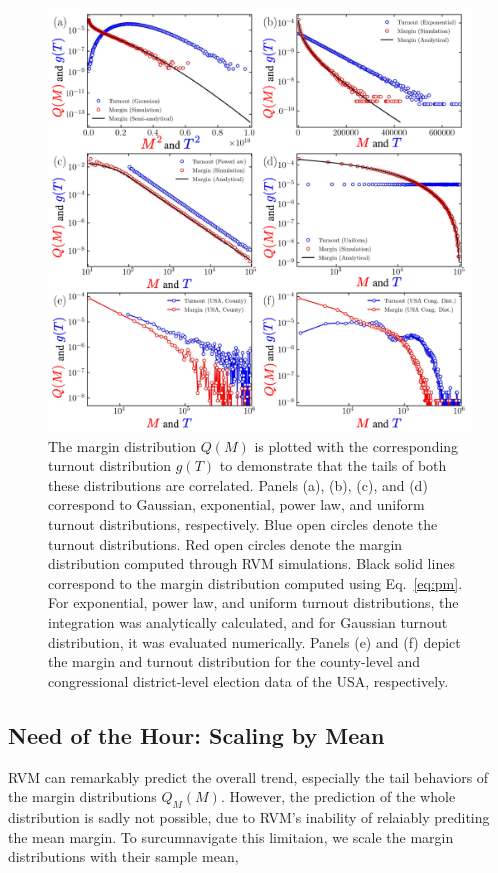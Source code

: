 \begin{figure}[H]
    \centering
    \includegraphics[width=\textwidth]{chapters/chapter5/margin_turnout_dists.pdf}
    \caption{The margin distribution $Q(M)$ is plotted with the corresponding turnout distribution $g(T)$ to demonstrate that the tails of both these distributions are correlated. Panels (a), (b), (c), and (d) correspond to Gaussian, exponential, power law, and uniform turnout distributions, respectively. Blue open circles denote the turnout distributions. Red open circles denote the margin distribution computed through RVM simulations. Black solid lines correspond to the margin distribution computed using Eq.~\ref{eq:pm}. For exponential, power law, and uniform turnout distributions, the integration was analytically calculated, and for Gaussian turnout distribution, it was evaluated numerically. Panels (e) and (f) depict the margin and turnout distribution for the county-level and congressional district-level election data of the USA, respectively.}
    \label{fig_sup_1}
\end{figure}
\subsection{Need of the Hour: Scaling by Mean}
RVM can remarkably predict the overall trend, especially the tail behaviors of the margin distributions $Q_M(M)$. However, the prediction of the whole distribution is sadly not possible, due to RVM's inability of relaiably prediting the mean margin. To surcumnavigate this limitaion, we scale the margin distributions with their sample mean, 

